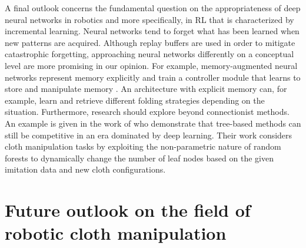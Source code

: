\documentclass[\home/main.tex]{subfiles}
\begin{document}
A final outlook concerns the fundamental question on the appropriateness of deep neural networks in robotics and more specifically, in \gls{RL} that is characterized by incremental learning. Neural networks tend to forget what has been learned when new patterns are acquired. Although replay buffers are used in order to mitigate catastrophic forgetting, approaching neural networks differently on a conceptual level are more promising in our opinion. For example, memory-augmented neural networks represent memory explicitly and train a controller module that learns to store and manipulate memory \autocite{graves2014neural}. An architecture with explicit memory can, for example, learn and retrieve different folding strategies depending on the situation. Furthermore, research should explore beyond connectionist methods. An example is given in the work of \textcite{Jia2019} who demonstrate that tree-based methods can still be competitive in an era dominated by deep learning. Their work considers cloth manipulation tasks by exploiting the non-parametric nature of random forests to dynamically change the number of leaf nodes based on the given imitation data and new cloth configurations.


\section{Future outlook on the field of robotic cloth manipulation} %
\end{document}
